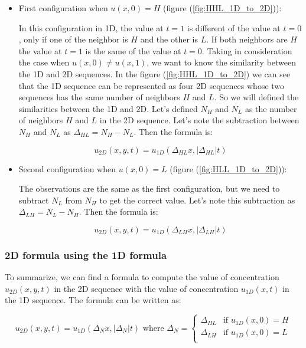 \begin{itemize}
    \item First configuration when $u(x,0)=H$ (figure (\ref{fig:HHL_1D_to_2D})):
    
    In this configuration in 1D, the value at $t=1$ is different of the value at $t=0$,
    only if one of the neighbor is $H$ and the other is $L$. If both neighbors are $H$
    the value at $t=1$ is the same of the value at $t=0$. Taking in consideration the
    case when $u(x,0) \neq u(x,1)$, we want to know the similarity between the 1D and 2D
    sequences. In the figure (\ref{fig:HHL_1D_to_2D}) we can see that the 1D sequence
    can be represented as four 2D sequences whose two sequences has the same number of 
    neighbors $H$ and $L$. So we will defined the similarities between the 1D and 2D.
    Let's defined $N_H$ and $N_L$ as the number of neighbors $H$ and $L$ in the 2D sequence.
    Let's note the subtraction between $N_H$ and $N_L$ as $\Delta_{HL}=N_H-N_L$. 
    Then the formula is:

    \begin{equation}
        u_{2D}(x,y,t)=u_{1D}(\Delta_{HL} x,|\Delta_{HL}|t) 
        \label{eq:2D_1D_H}
    \end{equation}
    
    \item Second configuration when $u(x,0)=L$ (figure (\ref{fig:HLL_1D_to_2D})):
    
    The observations are the same as the first configuration, but we need to subtract 
    $N_L$ from $N_H$ to get the correct value. Let's note this subtraction as 
    $\Delta_{LH}=N_L-N_H$. Then the formula is:

    \begin{equation}
        u_{2D}(x,y,t)=u_{1D}(\Delta_{LH} x,|\Delta_{LH}|t) 
        \label{eq:2D_1D_L}
    \end{equation}
\end{itemize}

\subsubsection{2D formula using the 1D formula}

To summarize, we can find a formula to compute the value of concentration $u_{2D}(x,y,t)$
in the 2D sequence with the value of concentration $u_{1D}(x,t)$ in the 1D sequence. The
formula can be written as:

\begin{equation}
    u_{2D}(x,y,t)=u_{1D}(\Delta_N x,|\Delta_N|t) 
    \mbox{ where } \Delta_N=
    \begin{cases}
        \Delta_{HL}&\text{if }u_{1D}(x,0) = H\\
        \Delta_{LH}&\text{if }u_{1D}(x,0) = L\\
    \end{cases}
    \label{eq:2D_1D}
\end{equation}

